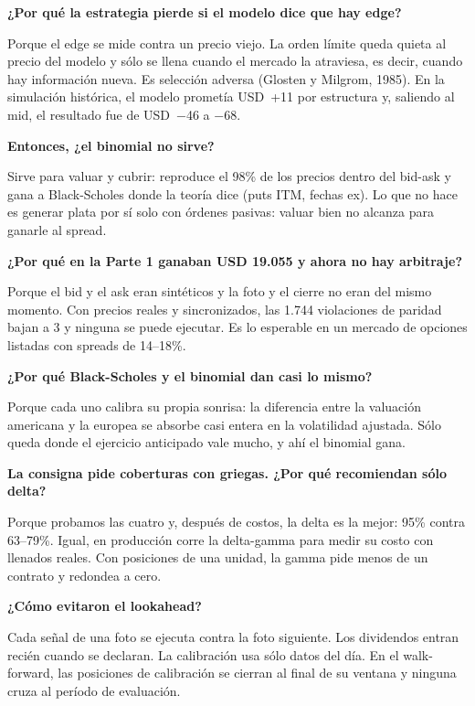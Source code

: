 \documentclass[11pt,a4paper]{article}
\newcommand{\usd}[1]{USD~#1}
\begin{document}
\newcommand{\pregunta}[2]{%
\begin{tcolorbox}[enhanced,breakable,colback=white,colframe=crr!30,boxrule=0.6pt,arc=3pt,left=9pt,right=9pt,top=5pt,bottom=5pt,before skip=6pt,after skip=6pt]
{\sffamily\bfseries\color{navy}#1}\par\vspace{3pt}#2
\end{tcolorbox}}

\pregunta{¿Por qué la estrategia pierde si el modelo dice que hay edge?}
{Porque el edge se mide contra un precio viejo. La orden límite queda quieta al precio del modelo y sólo se llena
cuando el mercado la atraviesa, es decir, cuando hay información nueva. Es selección adversa (Glosten y Milgrom,
1985). En la simulación histórica, el modelo prometía \usd{+11} por estructura y, saliendo al mid, el resultado fue de
\usd{−46} a −68.}

\pregunta{Entonces, ¿el binomial no sirve?}
{Sirve para valuar y cubrir: reproduce el 98\% de los precios dentro del bid-ask y gana a Black-Scholes donde la
teoría dice (puts ITM, fechas ex). Lo que no hace es generar plata por sí solo con órdenes pasivas: valuar bien no
alcanza para ganarle al spread.}

\pregunta{¿Por qué en la Parte 1 ganaban USD 19.055 y ahora no hay arbitraje?}
{Porque el bid y el ask eran sintéticos y la foto y el cierre no eran del mismo momento. Con precios reales y
sincronizados, las 1.744 violaciones de paridad bajan a 3 y ninguna se puede ejecutar. Es lo esperable en un mercado
de opciones listadas con spreads de 14–18\%.}

\pregunta{¿Por qué Black-Scholes y el binomial dan casi lo mismo?}
{Porque cada uno calibra su propia sonrisa: la diferencia entre la valuación americana y la europea se absorbe casi
entera en la volatilidad ajustada. Sólo queda donde el ejercicio anticipado vale mucho, y ahí el binomial gana.}

\pregunta{La consigna pide coberturas con griegas. ¿Por qué recomiendan sólo delta?}
{Porque probamos las cuatro y, después de costos, la delta es la mejor: 95\% contra 63–79\%. Igual, en producción corre
la delta-gamma para medir su costo con llenados reales. Con posiciones de una unidad, la gamma pide menos de un
contrato y redondea a cero.}

\pregunta{¿Cómo evitaron el lookahead?}
{Cada señal de una foto se ejecuta contra la foto siguiente. Los dividendos entran recién cuando se declaran. La
calibración usa sólo datos del día. En el walk-forward, las posiciones de calibración se cierran al final de su
ventana y ninguna cruza al período de evaluación.}
\end{document}
